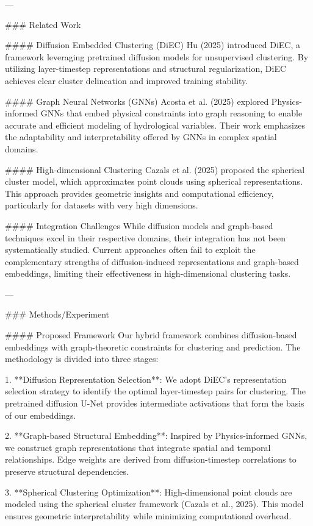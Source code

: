 ---

### Related Work

#### Diffusion Embedded Clustering (DiEC)
Hu (2025) introduced DiEC, a framework leveraging pretrained diffusion models for unsupervised clustering. By utilizing layer-timestep representations and structural regularization, DiEC achieves clear cluster delineation and improved training stability.

#### Graph Neural Networks (GNNs)
Acosta et al. (2025) explored Physics-informed GNNs that embed physical constraints into graph reasoning to enable accurate and efficient modeling of hydrological variables. Their work emphasizes the adaptability and interpretability offered by GNNs in complex spatial domains.

#### High-dimensional Clustering
Cazals et al. (2025) proposed the spherical cluster model, which approximates point clouds using spherical representations. This approach provides geometric insights and computational efficiency, particularly for datasets with very high dimensions.

#### Integration Challenges
While diffusion models and graph-based techniques excel in their respective domains, their integration has not been systematically studied. Current approaches often fail to exploit the complementary strengths of diffusion-induced representations and graph-based embeddings, limiting their effectiveness in high-dimensional clustering tasks.

---

### Methods/Experiment

#### Proposed Framework
Our hybrid framework combines diffusion-based embeddings with graph-theoretic constraints for clustering and prediction. The methodology is divided into three stages:

1. **Diffusion Representation Selection**: We adopt DiEC’s representation selection strategy to identify the optimal layer-timestep pairs for clustering. The pretrained diffusion U-Net provides intermediate activations that form the basis of our embeddings.
   
2. **Graph-based Structural Embedding**: Inspired by Physics-informed GNNs, we construct graph representations that integrate spatial and temporal relationships. Edge weights are derived from diffusion-timestep correlations to preserve structural dependencies.

3. **Spherical Clustering Optimization**: High-dimensional point clouds are modeled using the spherical cluster framework (Cazals et al., 2025). This model ensures geometric interpretability while minimizing computational overhead.

